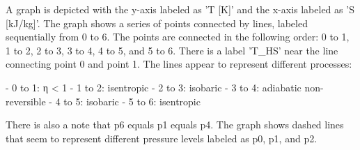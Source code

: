 A graph is depicted with the y-axis labeled as 'T [K]' and the x-axis labeled as 'S [kJ/kg]'. The graph shows a series of points connected by lines, labeled sequentially from 0 to 6. The points are connected in the following order: 0 to 1, 1 to 2, 2 to 3, 3 to 4, 4 to 5, and 5 to 6. There is a label 'T_HS' near the line connecting point 0 and point 1. The lines appear to represent different processes:

- 0 to 1: η < 1
- 1 to 2: isentropic
- 2 to 3: isobaric
- 3 to 4: adiabatic non-reversible
- 4 to 5: isobaric
- 5 to 6: isentropic

There is also a note that p6 equals p1 equals p4. The graph shows dashed lines that seem to represent different pressure levels labeled as p0, p1, and p2.